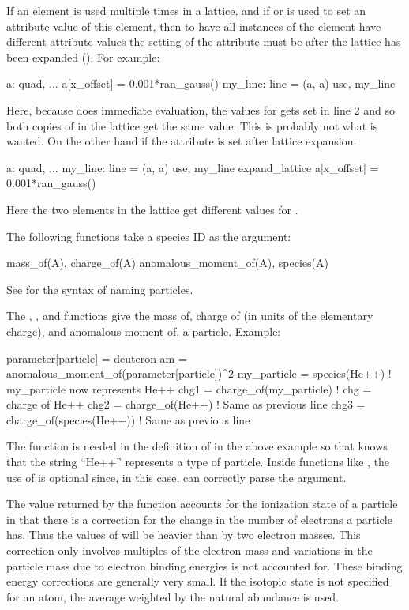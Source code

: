 {{{{{
If an element is used multiple times in a lattice, and if  or  is used to set
an attribute value of this element, then to have all instances of the element have different
attribute values the setting of the attribute must be after the lattice has been expanded
(). For example:
\begin{example}
  a: quad, ... 
  a[x_offset] = 0.001*ran_gauss()
  my_line: line = (a, a)
  use, my_line
\end{example}
Here, because \bmad does immediate evaluation, the  values for  gets set in line
2 and so both copies of  in the lattice get the same value. This is probably not what is
wanted.  On the other hand if the attribute is set after lattice expansion:
\begin{example}
  a: quad, ...
  my_line: line = (a, a)
  use, my_line
  expand_lattice
  a[x_offset] = 0.001*ran_gauss()
\end{example}
Here the two  elements in the lattice get different values for .

The following functions take a species ID as the argument:
\begin{example}
  mass_of(A),              charge_of(A)
  anomalous_moment_of(A),  species(A)
\end{example}
See  for the syntax of naming particles.

The , , and  functions give the mass of, charge of
(in units of the elementary charge), and anomalous moment of, a particle.  Example:
\begin{example}
  parameter[particle] = deuteron
  am = anomalous_moment_of(parameter[particle])^2
  my_particle = species(He++)      ! my_particle now represents He++
  chg1 = charge_of(my_particle)    ! chg = charge of He++
  chg2 = charge_of(He++)           ! Same as previous line
  chg3 = charge_of(species(He++))  ! Same as previous line
\end{example}
The  function is needed in the definition of  in the above example so
that \bmad knows that the string ``He++'' represents a type of particle. Inside functions like
, the use of  is optional since, in this case, \bmad can correctly parse the
argument. 

The value returned by the  function accounts for the ionization state of a particle in
that there is a correction for the change in the number of electrons a particle has.  Thus the
values of  will be heavier than  by two electron masses.
This correction only involves multiples of the electron mass and variations in the particle mass due
to electron binding energies is not accounted for. These binding energy corrections are generally
very small. If the isotopic state is not specified for an atom, the average weighted by the natural
abundance is used.

}}}}}
